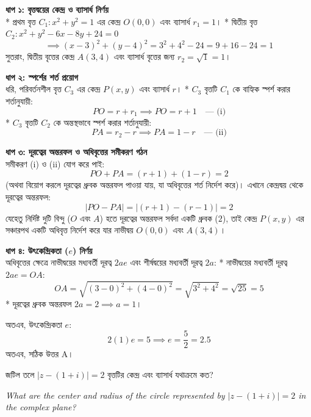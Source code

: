 \documentclass[12pt, a4paper]{article}
\begin{document}
\begin{tcolorbox}[solutionbox={সমাধান (Solution)}]
    \noindent
    \textbf{ধাপ ১: বৃত্তদ্বয়ের কেন্দ্র ও ব্যাসার্ধ নির্ণয়} \\
    * প্রথম বৃত্ত $C_1: x^2 + y^2 = 1$ এর কেন্দ্র $O(0, 0)$ এবং ব্যাসার্ধ $r_1 = 1$।
    * দ্বিতীয় বৃত্ত $C_2: x^2 + y^2 - 6x - 8y + 24 = 0$
    \[ \implies (x - 3)^2 + (y - 4)^2 = 3^2 + 4^2 - 24 = 9 + 16 - 24 = 1 \]
    সুতরাং, দ্বিতীয় বৃত্তের কেন্দ্র $A(3, 4)$ এবং ব্যাসার্ধ বৃত্তের জন্য $r_2 = \sqrt{1} = 1$।
    
    \vspace{0.5em}
    \noindent\textbf{ধাপ ২: স্পর্শের শর্ত প্রয়োগ} \\
    ধরি, পরিবর্তনশীল বৃত্ত $C_3$ এর কেন্দ্র $P(x, y)$ এবং ব্যাসার্ধ $r$।
    * $C_3$ বৃত্তটি $C_1$ কে বাহ্যিক স্পর্শ করার শর্তানুযায়ী:
    \[ PO = r + r_1 \implies PO = r + 1 \quad \text{--- (i)} \]
    * $C_3$ বৃত্তটি $C_2$ কে অন্তস্থভাবে স্পর্শ করার শর্তানুযায়ী:
    \[ PA = r_2 - r \implies PA = 1 - r \quad \text{--- (ii)} \]
    
    \vspace{0.5em}
    \noindent\textbf{ধাপ ৩: দূরত্বের অন্তরফল ও অধিবৃত্তের সমীকরণ গঠন} \\
    সমীকরণ (i) ও (ii) যোগ করে পাই:
    \[ PO + PA = (r + 1) + (1 - r) = 2 \]
    (অথবা বিয়োগ করলে দূরত্বের ধ্রুবক অন্তরফল পাওয়া যায়, যা অধিবৃত্তের শর্ত নির্দেশ করে)। এখানে কেন্দ্রদ্বয় থেকে দূরত্বের অন্তরফল:
    \[ |PO - PA| = |(r + 1) - (r - 1)| = 2 \]
    যেহেতু নির্দিষ্ট দুটি বিন্দু ($O$ এবং $A$) হতে দূরত্বের অন্তরফল সর্বদা একটি ধ্রুবক ($2$), তাই কেন্দ্র $P(x, y)$ এর সঞ্চারপথ একটি অধিবৃত্ত নির্দেশ করে যার নাভীদ্বয় $O(0,0)$ এবং $A(3,4)$।
    
    \vspace{0.5em}
    \noindent\textbf{ধাপ ৪: উৎকেন্দ্রিকতা ($e$) নির্ণয়} \\
    অধিবৃত্তের ক্ষেত্রে নাভীদ্বয়ের মধ্যবর্তী দূরত্ব $2ae$ এবং শীর্ষদ্বয়ের মধ্যবর্তী দূরত্ব $2a$:
    * নাভীদ্বয়ের মধ্যবর্তী দূরত্ব $2ae = OA$:
    \[ OA = \sqrt{(3 - 0)^2 + (4 - 0)^2} = \sqrt{3^2 + 4^2} = \sqrt{25} = 5 \]
    * দূরত্বের ধ্রুবক অন্তরফল $2a = 2 \implies a = 1$।
    
    অতএব, উৎকেন্দ্রিকতা $e$:
    \[ 2(1)e = 5 \implies e = \frac{5}{2} = 2.5 \]
    অতএব, সঠিক উত্তর A।
\end{tcolorbox}
\begin{tcolorbox}[questionbox={প্রশ্ন (Question) 21}]
    \noindent
    জটিল তলে $|z - (1 + i)| = 2$ বৃত্তটির কেন্দ্র এবং ব্যাসার্ধ যথাক্রমে কত?
    
    \vspace{0.8em}
    \begin{english}
    \noindent\textit{\color{darkgray}
    What are the center and radius of the circle represented by $|z - (1 + i)| = 2$ in the complex plane?
    }
    \end{english}
\end{tcolorbox}
\end{document}
